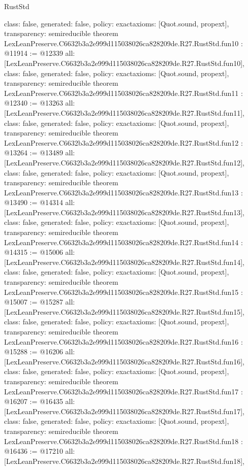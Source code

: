 \begin{lexlean}{RustStd}
\begin{coremodule}
{  class: false,
  generated: false,
  policy: exact{axioms: [Quot.sound, propext]},
  transparency: semireducible
}
theorem LexLeanPreserve.C6632b3a2e999d115038026ca828209de.R27.RustStd.fun10 : @11914 := @12339 {
  all: [LexLeanPreserve.C6632b3a2e999d115038026ca828209de.R27.RustStd.fun10],
  class: false,
  generated: false,
  policy: exact{axioms: [Quot.sound, propext]},
  transparency: semireducible
}
theorem LexLeanPreserve.C6632b3a2e999d115038026ca828209de.R27.RustStd.fun11 : @12340 := @13263 {
  all: [LexLeanPreserve.C6632b3a2e999d115038026ca828209de.R27.RustStd.fun11],
  class: false,
  generated: false,
  policy: exact{axioms: [Quot.sound, propext]},
  transparency: semireducible
}
theorem LexLeanPreserve.C6632b3a2e999d115038026ca828209de.R27.RustStd.fun12 : @13264 := @13489 {
  all: [LexLeanPreserve.C6632b3a2e999d115038026ca828209de.R27.RustStd.fun12],
  class: false,
  generated: false,
  policy: exact{axioms: [Quot.sound, propext]},
  transparency: semireducible
}
theorem LexLeanPreserve.C6632b3a2e999d115038026ca828209de.R27.RustStd.fun13 : @13490 := @14314 {
  all: [LexLeanPreserve.C6632b3a2e999d115038026ca828209de.R27.RustStd.fun13],
  class: false,
  generated: false,
  policy: exact{axioms: [Quot.sound, propext]},
  transparency: semireducible
}
theorem LexLeanPreserve.C6632b3a2e999d115038026ca828209de.R27.RustStd.fun14 : @14315 := @15006 {
  all: [LexLeanPreserve.C6632b3a2e999d115038026ca828209de.R27.RustStd.fun14],
  class: false,
  generated: false,
  policy: exact{axioms: [Quot.sound, propext]},
  transparency: semireducible
}
theorem LexLeanPreserve.C6632b3a2e999d115038026ca828209de.R27.RustStd.fun15 : @15007 := @15287 {
  all: [LexLeanPreserve.C6632b3a2e999d115038026ca828209de.R27.RustStd.fun15],
  class: false,
  generated: false,
  policy: exact{axioms: [Quot.sound, propext]},
  transparency: semireducible
}
theorem LexLeanPreserve.C6632b3a2e999d115038026ca828209de.R27.RustStd.fun16 : @15288 := @16206 {
  all: [LexLeanPreserve.C6632b3a2e999d115038026ca828209de.R27.RustStd.fun16],
  class: false,
  generated: false,
  policy: exact{axioms: [Quot.sound, propext]},
  transparency: semireducible
}
theorem LexLeanPreserve.C6632b3a2e999d115038026ca828209de.R27.RustStd.fun17 : @16207 := @16435 {
  all: [LexLeanPreserve.C6632b3a2e999d115038026ca828209de.R27.RustStd.fun17],
  class: false,
  generated: false,
  policy: exact{axioms: [Quot.sound, propext]},
  transparency: semireducible
}
theorem LexLeanPreserve.C6632b3a2e999d115038026ca828209de.R27.RustStd.fun18 : @16436 := @17210 {
  all: [LexLeanPreserve.C6632b3a2e999d115038026ca828209de.R27.RustStd.fun18],
}
\end{coremodule}
\end{lexlean}
